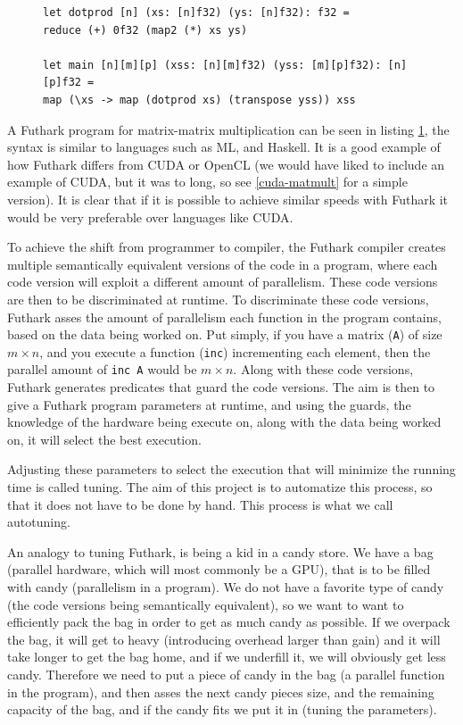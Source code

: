 \begin{figure}
\centering
\lstset{language=haskell}
\begin{lstlisting}
let dotprod [n] (xs: [n]f32) (ys: [n]f32): f32 =
reduce (+) 0f32 (map2 (*) xs ys)

let main [n][m][p] (xss: [n][m]f32) (yss: [m][p]f32): [n][p]f32 =
map (\xs -> map (dotprod xs) (transpose yss)) xss
\end{lstlisting}%
\label{IntromatmultFuthark}
\end{figure}
A Futhark program for matrix-matrix multiplication can be seen in listing
\ref{IntromatmultFuthark}, the syntax is similar to languages such as ML, and
Haskell. It is a good example of how Futhark differs from CUDA or OpenCL (we
would have liked to include an example of CUDA, but it was to long, so see
\ref{cuda-matmult} for a simple version). It is clear that if it is possible to achieve similar speeds 
with Futhark it would be very preferable over languages like CUDA.


To achieve the shift from programmer to compiler, the Futhark compiler creates multiple semantically
equivalent versions of the code in a program, where each code version will
exploit a different amount of parallelism. These code versions are then to be
discriminated at runtime. To discriminate these code versions, Futhark asses
the amount of parallelism each function in the program contains, based on the
data being worked on. Put simply, if you have a matrix (\texttt{A}) of size $m
\times n$, and you execute a function (\texttt{inc}) incrementing each element,
then the parallel amount of \texttt{inc A} would be $m \times n$. Along with
these code versions, Futhark generates predicates that guard the code versions.
The aim is then to give a Futhark program parameters at runtime, and using the
guards, the knowledge of the hardware being execute on, along with the data
being worked on, it will select the best execution.

Adjusting these parameters to select the execution that will minimize the
running time is called tuning. The aim of this project is to automatize this
process, so that it does not have to be done by hand. This process is what we
call autotuning.

An analogy to tuning Futhark, is being a kid in a candy store. We have a bag
(parallel hardware, which will most commonly be a GPU), that is to be filled
with candy (parallelism in a program). We do not have a favorite type of candy
(the code versions being semantically equivalent), so we want to want to
efficiently pack the bag in order to get as much candy as possible. If we
overpack the bag, it will get to heavy (introducing overhead larger than gain)
and it will take longer to get the bag home, and if we underfill it, we will
obviously get less candy. Therefore we need to put a piece of candy in the bag
(a parallel function in the program), and then asses the next candy pieces
size, and the remaining capacity of the bag, and if the candy fits we put it in
(tuning the parameters). 
